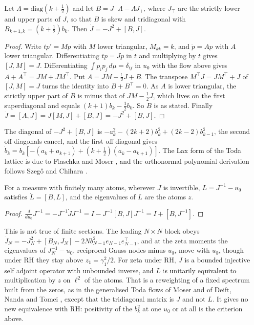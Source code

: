 \begin{theorem}\label{lx:thm:lax}
Let $\Lambda=\mathrm{diag}(k+\frac12)$ and let $B=J_-\Lambda-\Lambda J_+$, where $J_\mp$ are the strictly lower and upper parts of $J$, so that $B$ is skew and tridiagonal with $B_{k+1,k}=(k+\frac12)b_k$. Then $\dot J=-J^2+[B,J]$.
\end{theorem}

\begin{proof}
Write $tp'=Mp$ with $M$ lower triangular, $M_{kk}=k$, and $\dot p=Ap$ with $A$ lower triangular. Differentiating $tp=Jp$ in $t$ and multiplying by $t$ gives $[J,M]=J$. Differentiating $\int p_ip_j\,d\mu=\delta_{ij}$ in $u_0$ with the flow above gives $A+A^{\top}=JM+JM^{\top}$. Put $A=JM-\frac12J+B$. The transpose $M^{\top}J=JM^{\top}+J$ of $[J,M]=J$ turns the identity into $B+B^{\top}=0$. As $A$ is lower triangular, the strictly upper part of $B$ is minus that of $JM-\frac12J$, which lives on the first superdiagonal and equals $(k+1)b_k-\frac12b_k$. So $B$ is as stated. Finally $\dot J=[A,J]=J[M,J]+[B,J]=-J^2+[B,J]$.
\end{proof}

The diagonal of $-J^2+[B,J]$ is $-a_k^2-(2k+2)b_k^2+(2k-2)b_{k-1}^2$, the second off diagonals cancel, and the first off diagonal gives $\dot b_k=b_k[-(a_k+a_{k+1})+(k+\frac12)(a_k-a_{k+1})]$. The Lax form of the Toda lattice is due to Flaschka and Moser \cite{Flaschka74,Moser75}, and the orthonormal polynomial derivation follows Szeg\H o and Chihara \cite{Szego39,Chihara78}.

\begin{corollary}\label{lx:cor:iso}
For a measure with finitely many atoms, wherever $J$ is invertible, $L=J^{-1}-u_0$ satisfies $\dot L=[B,L]$, and the eigenvalues of $L$ are the atoms $z$.
\end{corollary}

\begin{proof}
$\frac{d}{du_0}J^{-1}=-J^{-1}\dot JJ^{-1}=I-J^{-1}[B,J]J^{-1}=I+[B,J^{-1}]$.
\end{proof}

This is not true of finite sections. The leading $N\times N$ block obeys $\dot J_N=-J_N^2+[B_N,J_N]-2Nb_{N-1}^2e_{N-1}e_{N-1}^{\top}$, and at the zeta moments the eigenvalues of $J_N^{-1}-u_0$, reciprocal Gauss nodes minus $u_0$, move with $u_0$, though under RH they stay above $z_1=\gamma_1^2/2$. For zeta under RH, $J$ is a bounded injective self adjoint operator with unbounded inverse, and $L$ is unitarily equivalent to multiplication by $z$ on $\ell^2$ of the atoms. That is a reweighting of a fixed spectrum built from the zeros, as in the generalised Toda flows of Moser and of Deift, Nanda and Tomei \cite{Moser75,DNT83}, except that the tridiagonal matrix is $J$ and not $L$. It gives no new equivalence with RH: positivity of the $b_k^2$ at one $u_0$ or at all is the criterion above.

